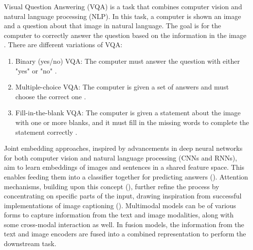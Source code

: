 \documentclass[pdflatex,sn-mathphys-num]{sn-jnl}%
\begin{document}
Visual Question Answering (VQA) is a task that combines computer vision and natural language processing (NLP). In this task, a computer is shown an image and a question about that image in natural language. The goal is for the computer to correctly answer the question based on the information in the image \cite{agrawal2016vqa}\cite{DBLP:journals/corr/ZhangGSBP15}\cite{zhu2016visual7w}\cite{yu2015visual}.
There are different variations of VQA:
\begin{enumerate}
\item Binary (yes/no) VQA: The computer must answer the question with either "yes" or "no" \cite{agrawal2016vqa}\cite{DBLP:journals/corr/ZhangGSBP15}.
\item Multiple-choice VQA: The computer is given a set of answers and must choose the correct one \cite{agrawal2016vqa}\cite{zhu2016visual7w}.
\item Fill-in-the-blank VQA: The computer is given a statement about the image with one or more blanks, and it must fill in the missing words to complete the statement correctly \cite{yu2015visual}.
\end{enumerate}

Joint embedding approaches, inspired by advancements in deep neural networks for both computer vision and natural language processing (CNNs and RNNs), aim to learn embeddings of images and sentences in a shared feature space. This enables feeding them into a classifier together for predicting answers (\cite{gao2015talking}\cite{andreas-etal-2016-learning}). Attention mechanisms, building upon this concept (\cite{andreas-etal-2016-learning}\cite{chen2016abccnn}\cite{zhu2016visual7w}), further refine the process by concentrating on specific parts of the input, drawing inspiration from successful implementations of image captioning (\cite{xu2016show}).
Multimodal models can be of various forms to capture information from the text and image modalities, along with some cross-modal interaction as well. In fusion models, the information from the text and image encoders are fused into a combined representation to perform the downstream task.
\end{document}
